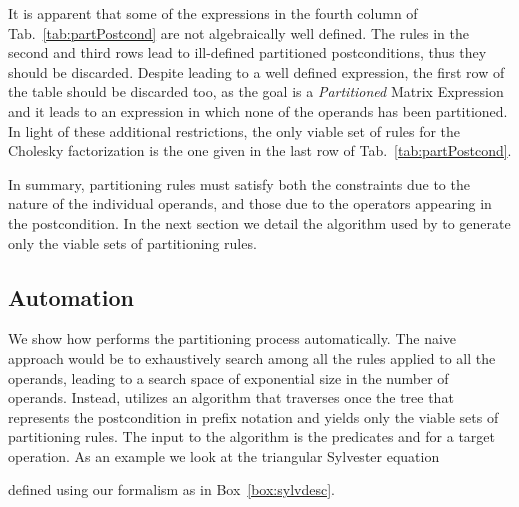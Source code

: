 \documentclass{llncs}
\newcommand{\click}{{\sc{Cl\makebox[.58\width][c]{1}ck}}}
\begin{document}
It is apparent that some of the expressions in the
fourth column of Tab.~\ref{tab:partPostcond} are not algebraically well defined.  
The rules in the
second and third rows lead to ill-defined partitioned postconditions,
thus they should be discarded.
Despite leading to a well defined expression, the first row of the table should
be discarded too, as the goal is a {\it Partitioned} Matrix Expression
and it leads to an expression 
in which none of the operands has been partitioned.
In light of these additional restrictions, the only viable set
of rules for the Cholesky factorization is the one given in the last row of 
Tab.~\ref{tab:partPostcond}. 

In summary, partitioning rules must satisfy
both the constraints due to the nature of the individual operands, 
and those due to the operators appearing in the postcondition. 
In the next section we detail the algorithm used by \click{} to
generate only the viable sets of partitioning rules.

\subsection{Automation} \label{subsec:automation}

We show how \click{} performs the partitioning process automatically.
The naive approach would be to exhaustively search among all the
rules applied to all the operands, leading to a search space of
exponential size in the number of operands. 
Instead, \click{} utilizes an algorithm that traverses once the tree
that represents the postcondition in prefix notation and yields only
the viable sets of partitioning rules. 
The input to the algorithm is the predicates  and  for a target operation.
As an example we look at the triangular Sylvester equation

defined using our formalism as in Box~\ref{box:sylvdesc}.
\end{document}
